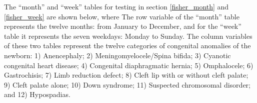 \documentclass[article,nojss]{jss}\usepackage[]{graphicx}\usepackage[]{color}
\newenvironment{knitrout}{}{} %
\newcommand{\fct}[1]{\code{#1()}}
\begin{document}





\newpage

\begin{appendix}








The ``month'' and ``week'' tables for testing \fct{fisher.sim} in section \ref{fisher_month} and \ref{fisher_week} are shown below, where 
The row variable of the ``month'' table represents the twelve months: from January to December, and for the ``week'' table it represents the seven weekdays: Monday to Sunday. The column variables of these two tables represent the twelve categories of congenital anomalies of the newborn: 1) Anencephaly; 2) Meningomyelocele/Spina bifida; 3) Cyanotic congenital heart disease; 4) Congenital diaphragmatic hernia; 5) Omphalocele; 6) Gastrochisis; 7) Limb reduction defect; 8) Cleft lip with or without cleft palate; 9) Cleft palate alone; 10) Down syndrome; 11) Suspected chromosomal disorder; and 12) Hypospadias.
\begin{knitrout}
\color{fgcolor}\begin{table}[H]


\end{table}
\end{knitrout}
\end{appendix}
\end{document}
